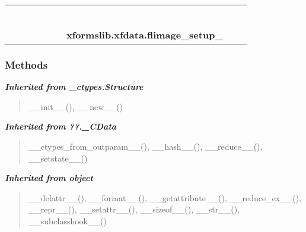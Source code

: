     \label{xformslib:xfdata:flimage_setup_}
\begin{tabular}{cccccccccc}
\multicolumn{2}{r}{\settowidth{\BCL}{object}\multirow{2}{\BCL}{object}}
&&
&&
&&
  \\\cline{3-3}
  &&\multicolumn{1}{c|}{}
&&
&&
&&
  \\
\multicolumn{4}{r}{\settowidth{\BCL}{??.\_CData}\multirow{2}{\BCL}{??.\_CData}}
&&
&&
  \\\cline{5-5}
  &&&&\multicolumn{1}{c|}{}
&&
&&
  \\
\multicolumn{6}{r}{\settowidth{\BCL}{\_ctypes.Structure}\multirow{2}{\BCL}{\_ctypes.Structure}}
&&
  \\\cline{7-7}
  &&&&&&\multicolumn{1}{c|}{}
&&
  \\
&&&&&&\multicolumn{2}{l}{\textbf{xformslib.xfdata.flimage\_setup\_}}
\end{tabular}



  \subsubsection{Methods}


\large{\textbf{\textit{Inherited from \_ctypes.Structure}}}

\begin{quote}
\_\_init\_\_(), \_\_new\_\_()
\end{quote}

\large{\textbf{\textit{Inherited from ??.\_CData}}}

\begin{quote}
\_\_ctypes\_from\_outparam\_\_(), \_\_hash\_\_(), \_\_reduce\_\_(), \_\_setstate\_\_()
\end{quote}

\large{\textbf{\textit{Inherited from object}}}

\begin{quote}
\_\_delattr\_\_(), \_\_format\_\_(), \_\_getattribute\_\_(), \_\_reduce\_ex\_\_(), \_\_repr\_\_(), \_\_setattr\_\_(), \_\_sizeof\_\_(), \_\_str\_\_(), \_\_subclasshook\_\_()
\end{quote}

